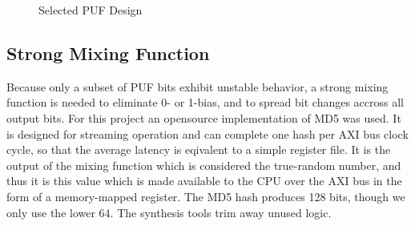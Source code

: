 \documentclass[journal]{IEEEtran}
\begin{document}
\begin{figure}
 \centering
  \caption{Selected PUF Design}
  \label{fig:design}
\vspace{-5mm}
\end{figure}

\subsection{Strong Mixing Function}

Because only a subset of PUF bits exhibit unstable behavior, a strong mixing function is needed to eliminate 0- or 1-bias, and to spread bit changes accross all output bits. For this project an opensource implementation of MD5 was used. It is designed for streaming operation and can complete one hash per AXI bus clock cycle, so that the average latency is eqivalent to a simple register file. It is the output of the mixing function which is considered the true-random number, and thus it is this value which is made available to the CPU over the AXI bus in the form of a memory-mapped register. The MD5 hash produces 128 bits, though we only use the lower 64. The synthesis tools trim away unused logic. 
\end{document}
